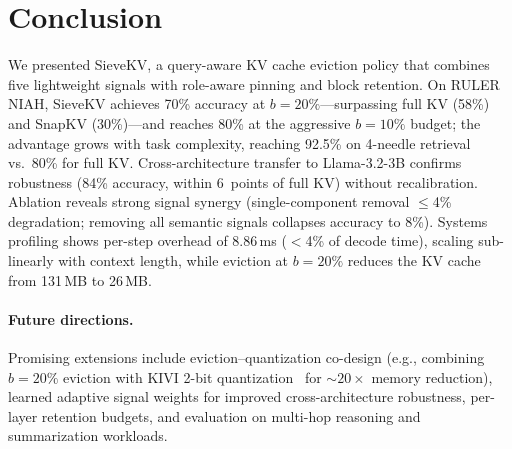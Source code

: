 \documentclass[runningheads]{llncs}
\begin{document}
\section{Conclusion}
\label{sec:conclusion}

We presented SieveKV, a query-aware KV cache eviction policy that
combines five lightweight signals with role-aware pinning and block retention.
On RULER NIAH, SieveKV achieves 70\% accuracy at $b{=}20\%$---surpassing
full KV (58\%) and SnapKV (30\%)---and reaches 80\% at the aggressive $b{=}10\%$
budget; the advantage grows with task complexity, reaching 92.5\% on 4-needle
retrieval vs.\ 80\% for full KV.
Cross-architecture transfer to Llama-3.2-3B confirms robustness (84\% accuracy,
within 6~points of full KV) without recalibration.
Ablation reveals strong signal synergy (single-component removal $\leq$4\%
degradation; removing all semantic signals collapses accuracy to 8\%).
Systems profiling shows per-step overhead of 8.86\,ms ($<$4\% of decode time),
scaling sub-linearly with context length, while eviction at $b{=}20\%$ reduces
the KV cache from 131\,MB to 26\,MB.

\paragraph{Future directions.}
Promising extensions include eviction--quantization co-design (e.g., combining
$b{=}20\%$ eviction with KIVI 2-bit quantization~\cite{liu2024kivi} for
${\sim}20{\times}$ memory reduction), learned adaptive signal weights for
improved cross-architecture robustness, per-layer retention budgets, and
evaluation on multi-hop reasoning and summarization workloads.



\end{document}
